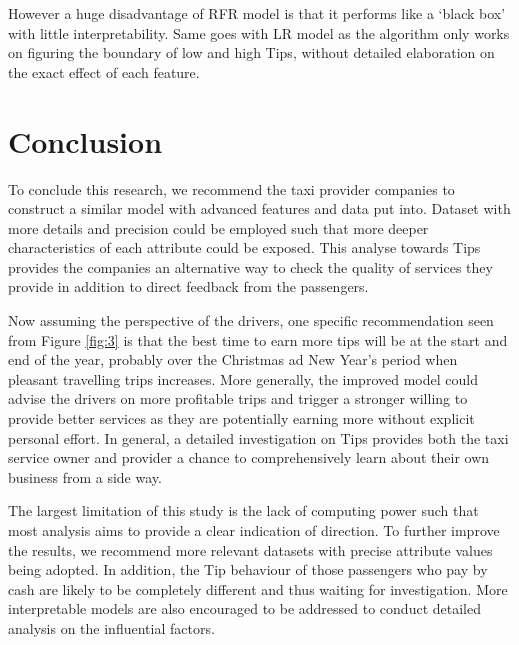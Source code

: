 \documentclass[11pt]{article}
\begin{document}
However a huge disadvantage of RFR model is that it performs like a `black box' with little interpretability. Same goes with LR model as the algorithm only works on figuring the boundary of low and high Tips, without detailed elaboration on the exact effect of each feature.



\section{Conclusion}
To conclude this research, we recommend the taxi provider companies to construct a similar model with advanced features and data put into. Dataset with more details and precision could be employed such that more deeper characteristics of each attribute could be exposed. This analyse towards Tips provides the companies an alternative way to check the quality of services they provide in addition to direct feedback from the passengers. 

Now assuming the perspective of the drivers, one specific recommendation seen from Figure \ref{fig:3} is that the best time to earn more tips will be at the start and end of the year, probably over the Christmas ad New Year's period when pleasant travelling trips increases. More generally, the improved model could advise the drivers on more profitable trips and trigger a stronger willing to provide better services as they are potentially earning more without explicit personal effort. In general, a detailed investigation on Tips provides both the taxi service owner and provider a chance to comprehensively learn about their own business from a side way.

The largest limitation of this study is the lack of computing power such that most analysis aims to provide a clear indication of direction. To further improve the results, we recommend more relevant datasets with precise attribute values being adopted. In addition, the Tip behaviour of those passengers who pay by cash are likely to be completely different and thus waiting for investigation. More interpretable models are also encouraged to be addressed to conduct detailed analysis on the influential factors.



\clearpage

\printbibliography
\end{document}
